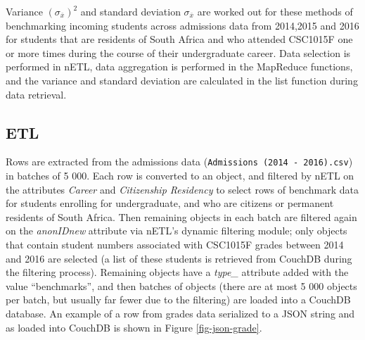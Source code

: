 Variance $(\sigma_{\overline{x}})^{2}$ and standard deviation $\sigma_{\overline{x}}$ are worked out for these methods of benchmarking incoming students across admissions data from 2014,2015 and 2016 for students that are residents of South Africa and who attended CSC1015F one or more times during the course of their undergraduate career. Data selection is performed in nETL, data aggregation is performed in the MapReduce functions, and the variance and standard deviation are calculated in the list function during data retrieval.

\subsection{ETL}
Rows are extracted from the admissions data (\texttt{Admissions (2014 - 2016).csv}) in batches of 5 000. Each row is converted to an object, and filtered by nETL on the attributes \textit{Career} and \textit{Citizenship Residency} to select rows of benchmark data for students enrolling for undergraduate, and who are citizens or permanent residents of South Africa. Then remaining objects in each batch are filtered again on the \textit{anonIDnew} attribute via nETL's dynamic filtering module; only objects that contain student numbers associated with CSC1015F grades between 2014 and 2016 are selected (a list of these students is retrieved from CouchDB during the filtering process). Remaining objects have a \textit{type\_} attribute added with the value ``benchmarks'', and then batches of objects (there are at most 5 000 objects per batch, but usually far fewer due to the filtering) are loaded into a CouchDB database. An example of a row from grades data serialized to a JSON string and as loaded into CouchDB is shown in Figure \ref{fig-json-grade}.



